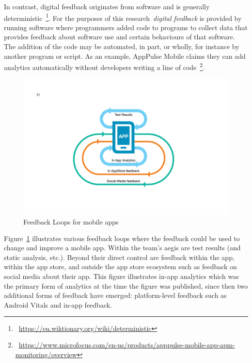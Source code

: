 In contrast, digital feedback originates from software and is generally deterministic~\footnote{~\url{https://en.wiktionary.org/wiki/deterministic}}. For the purposes of this research~\emph{digital feedback} is provided by running software where programmers added code to programs to collect data that provides feedback about software use and certain behaviours of that software. The addition of the code may be automated, in part, or wholly, for instance by another program or script. As an example, AppPulse Mobile claims they can add analytics automatically without developers writing a line of code~\footnote{~\url{https://www.microfocus.com/en-us/products/apppulse-mobile-app-apm-monitoring/overview}}.

\begin{figure}[htbp!]
    \centering
    \includegraphics[width=15cm]{images/mobile-analytics-playbook/Chart-07-FeedbackLoops.png}
    \caption{Feedback Loops for mobile apps~\citep{harty_aymer_playbook_2016}}
    \label{fig:map2015-feedback-loops-for-mobile-apps}
\end{figure}

Figure~\ref{fig:map2015-feedback-loops-for-mobile-apps} illustrates various feedback loops where the feedback could be used to change and improve a mobile app. Within the team's aegis are test results (and static analysis, etc.). Beyond their direct control are feedback within the app, within the app store, and outside the app store ecosystem such as feedback on social media about their app. This figure illustrates in-app analytics which was the primary form of analytics at the time the figure was published, since then two additional forms of feedback have emerged: platform-level feedback such as Android Vitals and in-app feedback.

